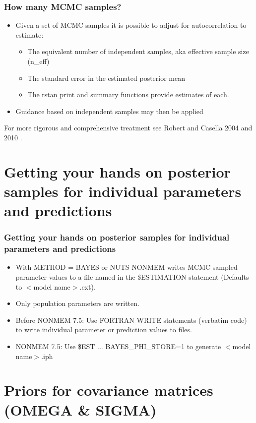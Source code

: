 \documentclass[handout]{beamer}
\begin{document}
\begin{frame}
  \frametitle{How many MCMC samples?}
  
\begin{itemize}
\item Given a set of MCMC samples it is possible to adjust for autocorrelation to estimate:
\begin{itemize}
\item The equivalent number of independent samples, aka effective
  sample size (n\_eff)
\item The standard error in the estimated posterior mean
\item The rstan print and summary functions provide estimates of each.
\end{itemize}
\item Guidance based on independent samples may then be applied
\end{itemize}
For more rigorous and comprehensive treatment see Robert and
  Casella 2004  and 2010 \cite{robertAndCasella2004,robertAndCasella2010}.

\end{frame}

\section[Getting posterior samples for individual parameters]{Getting
  your hands on posterior samples for individual parameters and
  predictions}

\begin{frame}
  \frametitle{Getting your hands on posterior samples for individual
    parameters and predictions}

  \begin{itemize}
  \item With METHOD = BAYES or NUTS NONMEM writes MCMC sampled
    parameter values to a file named in the \$ESTIMATION statement
    (Defaults to $<$model name$>$.ext).
  \item Only population parameters are written.
  \item Before NONMEM 7.5: Use FORTRAN WRITE statements (verbatim code) to write
    individual parameter or prediction values to files.
  \item NONMEM 7.5: Use \$EST ... BAYES\_PHI\_STORE=1 to generate $<$model name$>$.iph
  \end{itemize}
  
\end{frame}

\section{Priors for covariance matrices (OMEGA \& SIGMA)}
\end{document}
